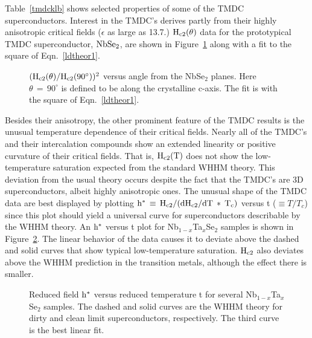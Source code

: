         Table~\ref{tmdcklb} shows selected properties of some  of the TMDC
superconductors.  Interest in  the TMDC's derives  partly from their highly
anisotropic critical fields ($\epsilon$  as large as  13.7.\cite{coleman83})
$\rm  H_{c2}(\theta)$ data for  the prototypical TMDC superconductor,  $\rm
NbSe_2$,  are shown  in  Figure~\ref{nbse2theta} along  with  a fit  to the
square of Eqn.~\ref{ldtheor1}.

\begin{figure}
\vspace{12cm}
\caption[$\rm H_{c2}(\theta)$ for NbSe$_2$, a TMDC superconductor]{$\rm 
(H_{c2}(\theta)/H_{c2}(90^{\circ}))^2$ versus angle   from   the   NbSe$_2$
planes.\cite{muto73} Here  $\theta \, =  \, 90^{\circ}$  is  defined to  be
along  the  crystalline  c-axis.    The   fit  is   with the    square   of
Eqn.~\ref{ldtheor1}.}
\label{nbse2theta}
\end{figure}

        Besides their  anisotropy, the  other prominent feature of the TMDC
results is the  unusual temperature dependence of  their  critical  fields.
Nearly all of the TMDC's and their intercalation compounds show an extended
linearity or  positive curvature  of their critical fields.\cite{woollam74}
That  is, $\rm  H_{c2}(T)$  does not   show the  low-temperature saturation
expected  from the standard   WHHM theory.   This  deviation from the usual
theory  occurs despite  the fact  that the TMDC's   are 3D superconductors,
albeit highly anisotropic ones.  The unusual shape of the TMDC data are best
displayed by plotting $\rm h^*
\, \equiv \,  H_{c2}  / (dH_{c2}/dT \:  *  \: T_c)$  versus t ($\equiv T/T_c$)
since   this  plot  should  yield a   universal  curve for  superconductors
describable by the WHHM theory.\cite{helfand66} An $\rm  h^*$ versus t plot
for Nb$_{1-x}$Ta$_{x}$Se$_2$ samples  is   shown in Figure~\ref{nbse2temp}.
The linear behavior of the data  causes it to  deviate above the dashed and
solid         curves    that      show         typical      low-temperature
saturation.\cite{saintjames69,orlando79} $\rm H_{c2}$ also   deviates above
the WHHM prediction in the transition metals, although  the effect there is
smaller.\cite{kerchner81}

\begin{figure}
\vspace{12cm}
\caption[Extended linearity of $\rm H_{c2}(t)$ in  Nb$_{1-x}$Ta$_x$Se$_2$]{Reduced 
field     $\rm  h^*$    versus  reduced   temperature    t  for     several
Nb$_{1-x}$Ta$_x$Se$_2$  samples.\cite{ikebe80}  The dashed and solid curves
are   the WHHM  theory   for   dirty  and  clean  limit    superconductors,
respectively.  The third curve is the best linear fit.}
\label{nbse2temp}
\end{figure}

